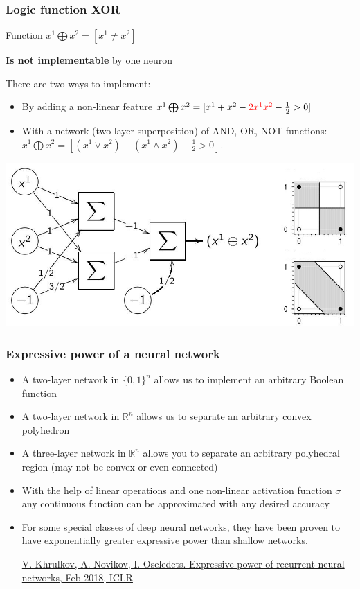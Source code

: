 \documentclass[fullscreen=true, bookmarks=true, hyperref={pdfencoding=unicode}]{beamer}
\begin{document}
\begin{frame}
  \frametitle{Logic function XOR}
  Function $x^1 \bigoplus x^2 = [x^1 \neq x^2]$ 

  {\bf Is not implementable} by one neuron
  
  There are two ways to implement:
  \begin{itemize}
      \item By adding a non-linear feature
      $x^1 \bigoplus x^2 = [x^1 + x^2 - { \color{red}2x^1 x^2} - \frac12 > 0]$
      \item With a network (two-layer superposition) of AND, OR, NOT functions:
      $x^1 \bigoplus x^2 = [(x^1 \vee x^2) - (x^1 \wedge x^2) - \frac12 > 0]$.
  \end{itemize}

\begin{center}
  \includegraphics[keepaspectratio, width=.7\paperwidth]{xor_nn.jpg}
\end{center}

\end{frame}


\begin{frame}
  \frametitle{Expressive power of a neural network}
  \begin{itemize}
      \item A two-layer network in $\{0, 1\}^n$ allows us to implement an arbitrary Boolean function
      \pause
      \item A two-layer network in $\mathbb{R}^n$ allows us to separate an arbitrary convex polyhedron
      \pause
      \item A three-layer network in $\mathbb{R}^n$ allows you to separate an arbitrary polyhedral region (may not be convex or even connected)
      \pause
      \item With the help of linear operations and one non-linear activation function $\sigma$ any continuous function can be approximated with any desired accuracy
      \pause
      \item For some special classes of deep neural networks, they have been proven to have exponentially greater expressive power than shallow networks. 

      {\small
      \href{https://arxiv.org/pdf/1711.00811.pdf}{V. Khrulkov, A. Novikov, I. Oseledets. Expressive power of recurrent neural networks, Feb 2018, ICLR}}
  \end{itemize}
\end{frame}
\end{document}
